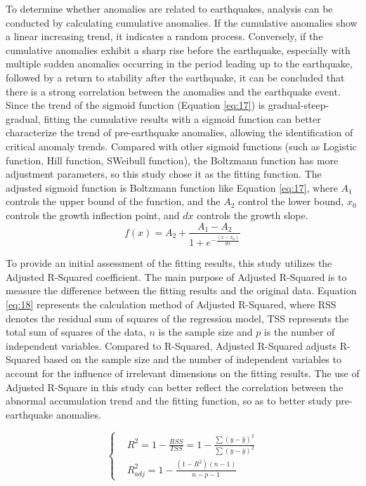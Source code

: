 \documentclass[3p,authoryear,preprint,12pt]{elsarticle}
\begin{document}
To determine whether anomalies are related to earthquakes, analysis can be conducted by calculating cumulative anomalies. If the cumulative anomalies show a linear increasing trend, it indicates a random process. Conversely, if the cumulative anomalies exhibit a sharp rise before the earthquake, especially with multiple sudden anomalies occurring in the period leading up to the earthquake, followed by a return to stability after the earthquake, it can be concluded that there is a strong correlation between the anomalies and the earthquake event. Since the trend of {the sigmoid function} (Equation \ref{eq:17}) is gradual-steep-gradual, fitting the cumulative results with a sigmoid function can better characterize the trend of pre-earthquake anomalies, allowing the identification of critical anomaly trends. {Compared with other sigmoid functions (such as Logistic function, Hill function, SWeibull function), the Boltzmann function has more adjustment parameters, so this study chose it as the fitting function.} The adjusted sigmoid function is Boltzmann function like Equation \ref{eq:17}, {where $A_1$ controls the upper bound of the function, and the $A_2$ control the lower bound, $x_0$ controls the growth inflection point, and $dx$ controls the growth slope.} 
\begin{equation}
	\label{eq:17}
	f(x) = A_2 + \frac{A_1-A_2}{1+e^{-\frac{(x-x_0)}{dx}}}
\end{equation}

To provide an initial assessment of the fitting results, this study utilizes the Adjusted R-Squared coefficient. The main purpose of Adjusted R-Squared is to measure the difference between the fitting results and the original data. Equation \ref{eq:18} represents the calculation method of Adjusted R-Squared, where RSS denotes the residual sum of squares of the regression model, TSS represents the total sum of squares of the data, {$n$ is the sample size and $p$ is the number of independent variables}. Compared to R-Squared, Adjusted R-Squared adjusts R-Squared based on the sample size and the number of independent variables to account for the influence of irrelevant dimensions on the fitting results. {The use of Adjusted R-Square in this study can better reflect the correlation between the abnormal accumulation trend and the fitting function, so as to better study pre-earthquake anomalies.}

\begin{equation}
	\label{eq:18}
	\left\lbrace\begin{split}
		& R^2 = 1 - \frac{RSS}{TSS} = 1 - \frac{\sum \left(  y - \hat{y} \right)^2}{\sum \left( y - \bar{y} \right)^2} \\
		& R_{adj}^2 = 1 -  \frac{\left(1-R^2\right)\left(n-1\right)}{n-p-1} 
	\end{split}\right.
\end{equation}
\end{document}
